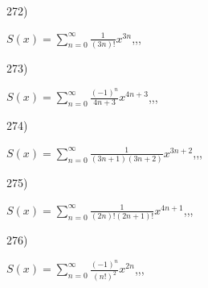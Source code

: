 \documentclass[11pt, ukrainian]{article}
\begin{document}
\par
\vspace{0.9cm}
272) \space 
{%
{$S(x)=\sum\limits_{n=0}^{\infty}{\frac{1}{(3n)!}}{x^{{3n}}}$},,, \par \smallskip  
}
\par
\vspace{0.9cm}
273) \space 
{%
{$S(x)=\sum\limits_{n=0}^{\infty}{\frac{(-1)^n}{4n+3}}{x^{{4n+3}}}$},,, \par \smallskip  
}
\par
\vspace{0.9cm}
274) \space 
{%
{$S(x)=\sum\limits_{n=0}^{\infty}{\frac{1}{(3n+1)(3n+2)}}{x^{{3n+2}}}$},,, \par \smallskip  
}
\par
\vspace{0.9cm}
275) \space 
{%
{$S(x)=\sum\limits_{n=0}^{\infty}{\frac{1}{(2n)!(2n+1)!}}{x^{{4n+1}}}$},,, \par \smallskip  
}
\par
\vspace{0.9cm}
276) \space 
{%
{$S(x)=\sum\limits_{n=0}^{\infty}{\frac{(-1)^n}{(n!)^2}}{x^{{2n}}}$},,, \par \smallskip  
}
\par
\vspace{0.9cm}
\end{document}
